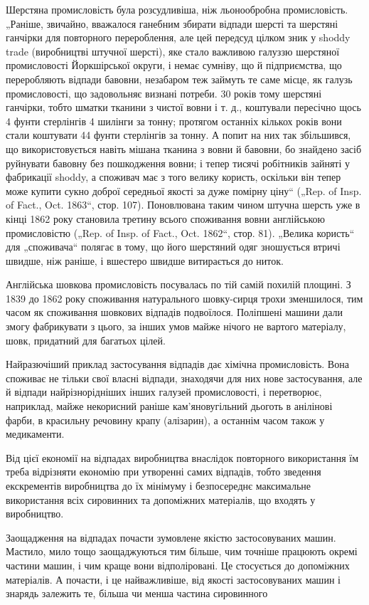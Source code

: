 Шерстяна промисловість була розсудливіша, ніж льонообробна промисловість. „Раніше, звичайно,
вважалося ганебним
збирати відпади шерсті та шерстяні ганчірки для повторного
перероблення, але цей передсуд цілком зник у shoddy trade
(виробництві штучної шерсті), яке стало важливою галуззю
шерстяної промисловості Йоркшірської округи, і немає сумніву,
що й підприємства, що переробляють відпади бавовни, незабаром теж займуть те саме місце, як галузь
промисловості, що
задовольняє визнані потреби. 30 років тому шерстяні ганчірки,
тобто шматки тканини з чистої вовни і т. д., коштували пересічно щось 4 фунти стерлінгів 4 шилінги
за тонну; протягом
останніх кількох років вони стали коштувати 44 фунти стерлінгів за тонну. А попит на них так
збільшився, що використовується
навіть мішана тканина з вовни й бавовни, бо знайдено засіб
руйнувати бавовну без пошкодження вовни; і тепер тисячі робітників зайняті у фабрикації shoddy, а
споживач має з того
велику користь, оскільки він тепер може купити сукно доброї
середньої якості за дуже помірну ціну“ („Rep. of Insp. of Fact.,
Oct. 1863“, стор. 107). Поновлювана таким чином штучна шерсть
уже в кінці 1862 року становила третину всього споживання
вовни англійською промисловістю („Rep. of Insp. of Fact., Oct.
1862“, стор. 81). „Велика користь“ для „споживача“ полягає в тому,
що його шерстяний одяг зношується втричі швидше, ніж раніше,
і вшестеро швидше витирається до ниток.

Англійська шовкова промисловість посувалась по тій самій
похилій площині. З 1839 до 1862 року споживання натурального
шовку-сирця трохи зменшилося, тим часом як споживання шовкових відпадів подвоїлося. Поліпшені машини
дали змогу фабрикувати з цього, за інших умов майже нічого не вартого матеріалу, шовк, придатний для
багатьох цілей.

Найразючіший приклад застосування відпадів дає хімічна
промисловість. Вона споживає не тільки свої власні відпади,
знаходячи для них нове застосування, але й відпади найрізнорідніших інших галузей промисловості, і
перетворює, наприклад,
майже некорисний раніше кам’яновугільний дьоготь в анілінові
фарби, в красильну речовину крапу (алізарин), а останнім часом
також у медикаменти.

Від цієї економії на відпадах виробництва внаслідок повторного використання їм треба відрізняти
економію при утворенні
самих відпадів, тобто зведення екскрементів виробництва до
їх мінімуму і безпосереднє максимальне використання всіх сировинних та допоміжних матеріалів, що
входять у виробництво.

Заощадження на відпадах почасти зумовлене якістю застосовуваних машин. Мастило, мило тощо
заощаджуються тим
більше, чим точніше працюють окремі частини машин, і чим краще
вони відполіровані. Це стосується до допоміжних матеріалів.
А почасти, і це найважливіше, від якості застосовуваних машин
і знарядь залежить те, більша чи менша частина сировинного
\parbreak{}  %

